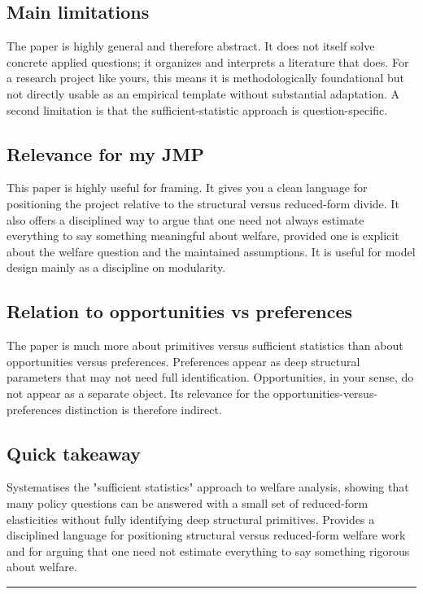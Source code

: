 \documentclass[11pt,a4paper]{article}
\begin{document}
\subsection*{Main limitations}
The paper is highly general and therefore abstract. It does not itself solve concrete applied questions; it organizes and interprets a literature that does. For a research project like yours, this means it is methodologically foundational but not directly usable as an empirical template without substantial adaptation. A second limitation is that the sufficient-statistic approach is question-specific.

\subsection*{Relevance for my JMP}
This paper is highly useful for framing. It gives you a clean language for positioning the project relative to the structural versus reduced-form divide. It also offers a disciplined way to argue that one need not always estimate everything to say something meaningful about welfare, provided one is explicit about the welfare question and the maintained assumptions. It is useful for model design mainly as a discipline on modularity.

\subsection*{Relation to opportunities vs preferences}
The paper is much more about primitives versus sufficient statistics than about opportunities versus preferences. Preferences appear as deep structural parameters that may not need full identification. Opportunities, in your sense, do not appear as a separate object. Its relevance for the opportunities-versus-preferences distinction is therefore indirect.

\subsection*{Quick takeaway}
Systematises the "sufficient statistics" approach to welfare analysis, showing that many policy questions can be answered with a small set of reduced-form elasticities without fully identifying deep structural primitives. Provides a disciplined language for positioning structural versus reduced-form welfare work and for arguing that one need not estimate everything to say something rigorous about welfare.


\medskip\hrule\medskip
\end{document}
